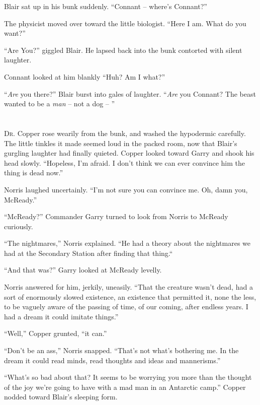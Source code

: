\documentclass[letterpaper,openany,12pt]{memoir}		%
\begin{document}
Blair sat up in his bunk suddenly. ``Connant -- where's Connant?''

The physicist moved over toward the little biologist. ``Here I am. What do you
want?''

``Are You?'' giggled Blair. He lapsed back into the bunk contorted with silent
laughter.

Connant looked at him blankly ``Huh? Am I what?''

``\emph{Are} you there?'' Blair burst into gales of laughter. ``\emph{Are} you
Connant? The beast wanted to be a \emph{man} -- not a dog -- ''


\chapter[Chapter 7]{}

\lettrine[lines=3,findent=2pt,nindent=2pt]{D}{r.} Copper rose wearily from the
bunk, and washed the hypodermic carefully. The little tinkles it made seemed
loud in the packed room, now that Blair's gurgling laughter had finally quieted.
Copper looked toward Garry and shook his head slowly. ``Hopeless, I'm afraid. I
don't think we can ever convince him the thing is dead now.''

Norris laughed uncertainly. ``I'm not sure you can convince me. Oh, damn you,
McReady.''

``McReady?'' Commander Garry turned to look from Norris to McReady curiously.

``The nightmares,'' Norris explained. ``He had a theory about the nightmares we
had at the Secondary Station after finding that thing.``

``And that was?'' Garry looked at McReady levelly.

Norris answered for him, jerkily, uneasily. ``That the creature wasn't dead, had
a sort of enormously slowed existence, an existence that permitted it, none the
less, to be vaguely aware of the passing of time, of our coming, after endless
years. I had a dream it could imitate things.''

``Well,'' Copper grunted, ``it can.''

``Don't be an ass,'' Norris snapped. ``That's not what's bothering me. In the
dream it could read minds, read thoughts and ideas and mannerisms.''

``What's so bad about that? It seems to be worrying you more than the thought of
the joy we're going to have with a mad man in an Antarctic camp.'' Copper nodded
toward Blair's sleeping form.
\end{document}
